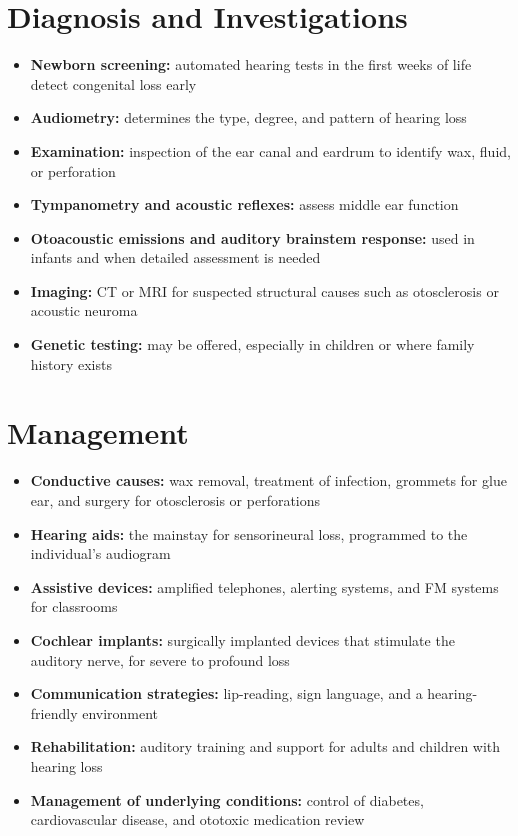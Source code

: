\section*{Diagnosis and Investigations}
\begin{itemize}
    \item \textbf{Newborn screening:} automated hearing tests in the first weeks of life detect congenital loss early
    \item \textbf{Audiometry:} determines the type, degree, and pattern of hearing loss
    \item \textbf{Examination:} inspection of the ear canal and eardrum to identify wax, fluid, or perforation
    \item \textbf{Tympanometry and acoustic reflexes:} assess middle ear function
    \item \textbf{Otoacoustic emissions and auditory brainstem response:} used in infants and when detailed assessment is needed
    \item \textbf{Imaging:} CT or MRI for suspected structural causes such as otosclerosis or acoustic neuroma
    \item \textbf{Genetic testing:} may be offered, especially in children or where family history exists
\end{itemize}

\section*{Management}
\begin{itemize}
    \item \textbf{Conductive causes:} wax removal, treatment of infection, grommets for glue ear, and surgery for otosclerosis or perforations
    \item \textbf{Hearing aids:} the mainstay for sensorineural loss, programmed to the individual's audiogram
    \item \textbf{Assistive devices:} amplified telephones, alerting systems, and FM systems for classrooms
    \item \textbf{Cochlear implants:} surgically implanted devices that stimulate the auditory nerve, for severe to profound loss
    \item \textbf{Communication strategies:} lip-reading, sign language, and a hearing-friendly environment
    \item \textbf{Rehabilitation:} auditory training and support for adults and children with hearing loss
    \item \textbf{Management of underlying conditions:} control of diabetes, cardiovascular disease, and ototoxic medication review
\end{itemize}

